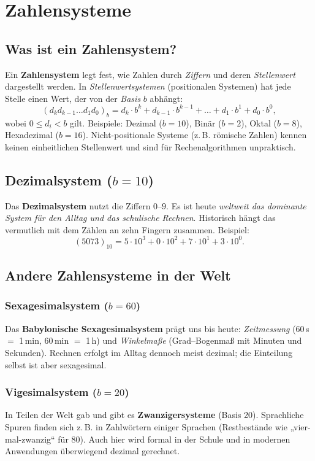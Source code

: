 \documentclass[12pt,a4paper]{book}
\begin{document}
\chapter{Zahlensysteme}

\section{Was ist ein Zahlensystem?}
Ein \textbf{Zahlensystem} legt fest, wie Zahlen durch \emph{Ziffern} und deren \emph{Stellenwert} dargestellt werden.
In \emph{Stellenwertsystemen} (positionalen Systemen) hat jede Stelle einen Wert, der von der \emph{Basis} \(b\) abhängt:
\[
(d_k d_{k-1}\ldots d_1 d_0)_b
= d_k\cdot b^{k}+d_{k-1}\cdot b^{k-1}+\ldots + d_1\cdot b^1 + d_0\cdot b^0,
\]
wobei \(0 \le d_i < b\) gilt. Beispiele: Dezimal (\(b=10\)), Binär (\(b=2\)), Oktal (\(b=8\)), Hexadezimal (\(b=16\)).
Nicht-positionale Systeme (z.\,B. römische Zahlen) kennen keinen einheitlichen Stellenwert und sind für Rechenalgorithmen unpraktisch.

\section{Dezimalsystem (\(b=10\))}
Das \textbf{Dezimalsystem} nutzt die Ziffern \(0\)–\(9\).
Es ist heute \emph{weltweit das dominante System für den Alltag und das schulische Rechnen}.
Historisch hängt das vermutlich mit dem Zählen an zehn Fingern zusammen.
Beispiel:
\[
(5073)_{10} = 5\cdot 10^3 + 0\cdot 10^2 + 7\cdot 10^1 + 3\cdot 10^0.
\]

\section{Andere Zahlensysteme in der Welt}
\subsection*{Sexagesimalsystem (\(b=60\))}
Das \textbf{Babylonische Sexagesimalsystem} prägt uns bis heute: \emph{Zeitmessung} (60\,s \(=\) 1\,min, 60\,min \(=\) 1\,h) und \emph{Winkelmaße} (Grad–Bogenmaß mit Minuten und Sekunden). Rechnen erfolgt im Alltag dennoch meist dezimal; die Einteilung selbst ist aber sexagesimal.

\subsection*{Vigesimalsystem (\(b=20\))}
In Teilen der Welt gab und gibt es \textbf{Zwanzigersysteme} (Basis 20).
Sprachliche Spuren finden sich z.\,B. in Zahlwörtern einiger Sprachen (Restbestände wie „vier-mal-zwanzig“ für 80).
Auch hier wird formal in der Schule und in modernen Anwendungen überwiegend dezimal gerechnet.
\end{document}
